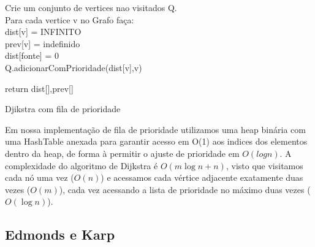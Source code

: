 \documentclass[12pt,a4]{article}
\begin{document}
\begin{algorithm}[H]
  \SetAlgoLined
  Crie um conjunto de vertices nao visitados Q. \\
  Para cada vertice v no Grafo faça: \\
  dist[v] = INFINITO \\
  prev[v] = indefinido \\
  dist[fonte] = 0 \\
  Q.adicionarComPrioridade(dist[v],v) \\


  return dist[],prev[]
  \caption{Djikstra com fila de prioridade}
\end{algorithm}

Em nossa implementação de fila de prioridade utilizamos uma heap binária com uma
HashTable anexada para garantir acesso em O(1) aos indices dos elementos dentro
da heap, de forma à permitir o ajuste de prioridade em $O(logn)$. A complexidade
do algoritmo de Dijkstra é $O(m \log n + n)$, visto que visitamos cada nó uma
vez ($O(n)$) e acessamos cada vértice adjacente exatamente duas vezes ($O(m)$),
cada vez acessando a lista de prioridade no máximo duas vezes ($O(\log n)$).

\subsection{Edmonds e Karp}
\label{subsec:edmonds-karp}
\end{document}
